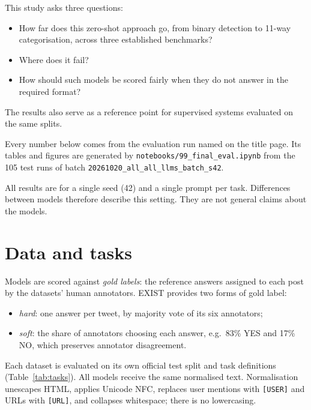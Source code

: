 \documentclass[11pt]{article}
\begin{document}
This study asks three questions:
\begin{itemize}
  \item How far does this zero-shot approach go, from binary detection to 11-way categorisation, across three established benchmarks?
  \item Where does it fail?
  \item How should such models be scored fairly when they do not answer in the required format?
\end{itemize}
The results also serve as a reference point for supervised systems evaluated on the same splits.

Every number below comes from the evaluation run named on the title page. Its tables and figures are generated by \texttt{notebooks/99\_final\_eval.ipynb} from the 105 test runs of batch \texttt{20261020\_all\_all\_llms\_batch\_s42}.

All results are for a single seed (42) and a single prompt per task. Differences between models therefore describe this setting. They are not general claims about the models.

\section{Data and tasks}\label{sec:data}
Models are scored against \emph{gold labels}: the reference answers assigned to each post by the datasets' human annotators. EXIST provides two forms of gold label:
\begin{itemize}
  \item \emph{hard}: one answer per tweet, by majority vote of its six annotators;
  \item \emph{soft}: the share of annotators choosing each answer, e.g.\ 83\% YES and 17\% NO, which preserves annotator disagreement.
\end{itemize}

Each dataset is evaluated on its own official test split and task definitions (Table~\ref{tab:tasks}). All models receive the same normalised text. Normalisation unescapes HTML, applies Unicode NFC, replaces user mentions with \texttt{[USER]} and URLs with \texttt{[URL]}, and collapses whitespace; there is no lowercasing.
\end{document}
